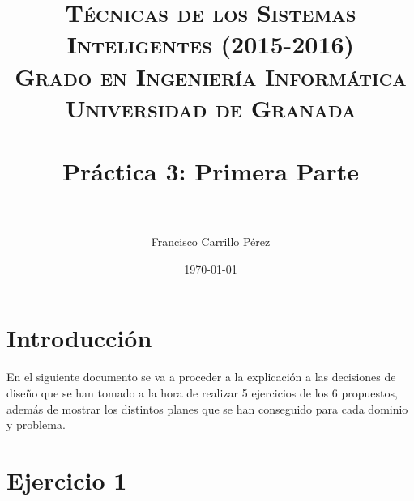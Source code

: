 
 \usepackage{algpseudocode}

\title{	
\normalfont \normalsize 
\textsc{{\bf Técnicas de los Sistemas Inteligentes (2015-2016)} \\ Grado en Ingeniería Informática \\ Universidad de Granada} \\ [25pt] %
\horrule{0.5pt} \\[0.4cm] %
\huge Práctica 3: Primera Parte \\ %
\horrule{2pt} \\[0.5cm] %
}

\author{Francisco Carrillo Pérez} %

\date{\normalsize\today} %




\maketitle %

\newpage %

\tableofcontents %

\listoffigures

\newpage

\section*{Introducción}
En el siguiente documento se va a proceder a la explicación a las decisiones de diseño que se han tomado a la hora de realizar 5 ejercicios de los 6 propuestos, además de mostrar los distintos planes que se han conseguido para cada dominio y problema.

\section{Ejercicio 1}
